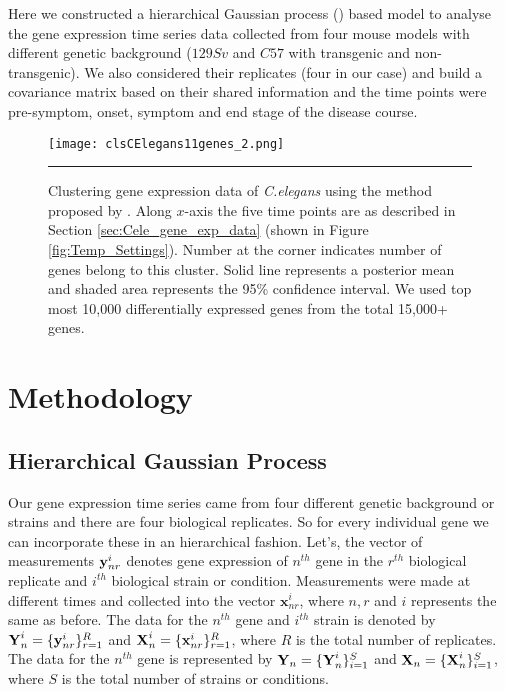 Here we constructed a hierarchical Gaussian process (\cite{Hensman:2013}) based model to analyse the gene expression time series data collected from four mouse models with different genetic background ($129Sv$ and $C57$ with transgenic and non-transgenic). We also considered their replicates (four in our case) and build a covariance matrix based on their shared information and the time points were pre-symptom, onset, symptom and end stage of the disease course.
\begin{figure}
	\centering
		\texttt{[image: clsCElegans11genes\_2.png]}
		\rule{35em}{0.5pt}
	\caption[Clustering gene expression data of \textit{C.elegans}]
		{Clustering gene expression data of \textit{C.elegans} using the method proposed by \cite{Hensman:2013}. Along $x$-axis the five time points are as described in Section \ref{sec:Cele_gene_exp_data} (shown in Figure \ref{fig:Temp_Settings}). Number at the corner indicates number of genes belong to this cluster. Solid line represents a posterior mean and shaded area represents the 95\% confidence interval. We used top most 10,000 differentially expressed genes from the total 15,000+ genes.} %
	\label{fig:clsCelegans}
\end{figure}

\section{Methodology}

\subsection{Hierarchical Gaussian Process}
Our gene expression time series came from four different genetic background or strains and there are four biological replicates. So for every individual gene we can incorporate these in an hierarchical fashion. Let's, the vector of measurements ${\textbf y}^{i}_{nr}$ denotes gene expression of $n^{th}$ gene in the $r^{th}$ biological replicate and $i^{th}$ biological strain or condition. Measurements were made at different times and collected into the vector $\textbf{x}^{i}_{nr}$, where $n, r$ and $i$ represents the same as before. The data for the $n^{th}$ gene and $i^{th}$ strain is denoted by ${\textbf Y}^{i}_n = \{{\textbf y}^{i}_{nr}\}^{R}_{r=1}$ and ${\textbf X}^{i}_n = \{{\textbf x}^{i}_{nr}\}^{R}_{r=1}$, where $R$ is the total number of replicates. The data for the $n^{th}$ gene is represented by ${\textbf Y}_n = \{{\textbf Y}^{i}_{n}\}^{S}_{i=1}$ and ${\textbf X}_n = \{{\textbf X}^{i}_{n}\}^{S}_{i=1}$, where $S$ is the total number of strains or conditions.

